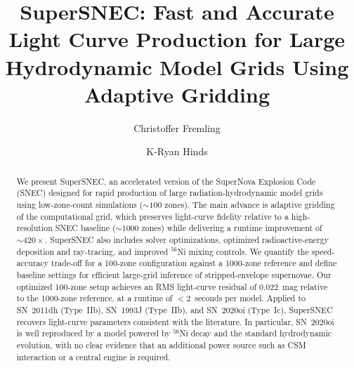 \documentclass[twocolumn,linenumbers]{aastex701}
\begin{document}
\newcommand{\Mcore}{M_{\rm core}}
\newcommand{\MNi}{M_{\rm Ni}}
\newcommand{\Msun}{{\rm M}_\odot}
\newcommand{\Rsun}{{\rm R}_\odot}
\newcommand{\Lsun}{{\rm L}_\odot}
\newcommand{\Nif}{$\rm ^{56}Ni$}
\newcommand{\rev}[1]{#1}
\newcommand{\revd}[1]{\textcolor{red}{#1}}

\title{SuperSNEC: Fast and Accurate Light Curve Production for Large Hydrodynamic Model Grids Using Adaptive Gridding}

\author[0000-0002-4223-103X]{Christoffer Fremling}
\author[0000-0002-0129-806X]{K-Ryan Hinds}

\begin{abstract}
We present SuperSNEC, an accelerated version of the SuperNova Explosion Code (SNEC) designed for rapid production of large radiation-hydrodynamic model grids using low-zone-count simulations ($\sim100$ zones). The main advance is adaptive gridding of the computational grid, which preserves light-curve fidelity relative to a high-resolution SNEC baseline ($\sim1000$ zones) while delivering a runtime improvement of ${\sim}420\times$. SuperSNEC also includes solver optimizations, optimized radioactive-energy deposition and ray-tracing, and improved $^{56}$Ni mixing controls. We quantify the speed-accuracy trade-off for a 100-zone configuration against a 1000-zone reference and define baseline settings for efficient large-grid inference of stripped-envelope supernovae. Our optimized 100-zone setup achieves an RMS light-curve residual of $0.022$~mag relative to the 1000-zone reference, at a runtime of $<2$~seconds per model. Applied to SN~2011dh (Type~IIb), SN~1993J (Type~IIb), and SN~2020oi (Type~Ic), SuperSNEC recovers light-curve parameters consistent with the literature. In particular, SN~2020oi is well reproduced by a model powered by $^{56}$Ni decay and the standard hydrodynamic evolution, with no clear evidence that an additional power source such as CSM interaction or a central engine is required.
\end{abstract}
\end{document}
